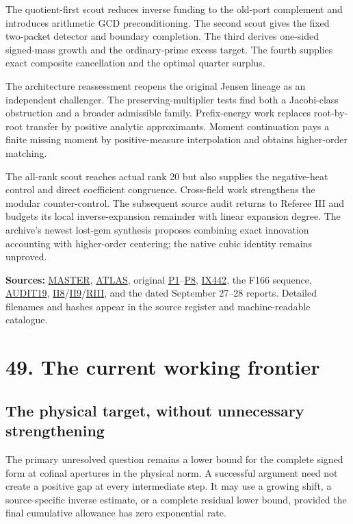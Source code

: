 \documentclass[
  10pt,
  a4paper,
  10pt,
  oneside,
  openany]{book}
\begin{document}
The quotient-first scout reduces inverse funding to the old-port
complement and introduces arithmetic GCD preconditioning. The second
scout gives the fixed two-packet detector and boundary completion. The
third derives one-sided signed-mass growth and the ordinary-prime excess
target. The fourth supplies exact composite cancellation and the optimal
quarter surplus.

The architecture reassessment reopens the original Jensen lineage as an
independent challenger. The preserving-multiplier tests find both a
Jacobi-class obstruction and a broader admissible family. Prefix-energy
work replaces root-by-root transfer by positive analytic approximants.
Moment continuation pays a finite missing moment by positive-measure
interpolation and obtains higher-order matching.

The all-rank scout reaches actual rank 20 but also supplies the
negative-heat control and direct coefficient congruence. Cross-field
work strengthens the modular counter-control. The subsequent source
audit returns to Referee III and budgets its local inverse-expansion
remainder with linear expansion degree. The archive's newest lost-gem
synthesis proposes combining exact innovation accounting with
higher-order centering; the native cubic identity remains unproved.

\textbf{Sources:} \hyperref[source-master]{MASTER},
\hyperref[source-atlas]{ATLAS}, original
\hyperref[source-p1]{P1}--\hyperref[source-p8]{P8},
\hyperref[source-ix442]{IX442}, the F166 sequence,
\hyperref[source-audit19]{AUDIT19},
\hyperref[source-ii8]{II8}/\hyperref[source-ii9]{II9}/\hyperref[source-riii]{RIII},
and the dated September 27--28 reports. Detailed filenames and hashes
appear in the source register and machine-readable catalogue.

\section{49. The current working frontier}\label{ch-frontier}

\subsection{The physical target, without unnecessary
strengthening}\label{the-physical-target-without-unnecessary-strengthening}

The primary unresolved question remains a lower bound for the complete
signed form at cofinal apertures in the physical norm. A successful
argument need not create a positive gap at every intermediate step. It
may use a growing shift, a source-specific inverse estimate, or a
complete residual lower bound, provided the final cumulative allowance
has zero exponential rate.
\end{document}
